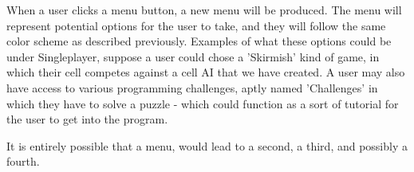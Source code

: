 When a user clicks a menu button, a new menu will be produced. The menu will represent potential options for the user to take, and they will follow the 
same color scheme as described previously. Examples of what these options could be under Singleplayer, suppose a user could chose a 'Skirmish' kind of 
game, in which their cell competes against a cell AI that we have created. A user may also have access to various programming challenges, aptly named 
'Challenges' in which they have to solve a puzzle - which could function as a sort of tutorial for the user to get into the program. 

It is entirely possible that a menu, would lead to a second, a third, and possibly a fourth.